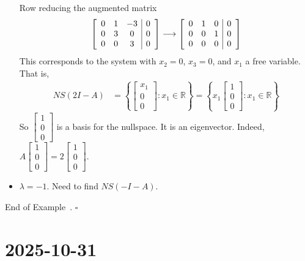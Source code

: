 \documentclass[10pt]{article}
\newenvironment{augmentedmatrix}[1] %
{\left[\begin{array}{#1}}
    {\end{array}\right]}
\theoremstyle{definition}
\newtheorem{example}[theorem]{Example}
\renewenvironment{example}
{\begin{oldexample}}
  {\par\smallskip\hfill   End of Example~\theexample. $\square$    \par\end{oldexample}}
\newcommand{\R}{\mathbb{R}}           %
\begin{document}
\begin{example}
\begin{itemize}
    Row reducing the augmented matrix
    \begin{equation*}
      \begin{augmentedmatrix}{ccc|c}
        0&1&-3&0\\
        0&3&0&0\\
        0&0&3&0
      \end{augmentedmatrix}
      \longrightarrow
      \begin{augmentedmatrix}{ccc|c}
        0&1&0&0\\
        0&0&1&0\\
        0&0&0&0
      \end{augmentedmatrix}
    \end{equation*}
    This corresponds to the system with $x_{2}=0$, $x_{3}=0$, and $x_{1}$ a
    free variable. That is,
    \begin{align*}
      NS(2I-A) 
      &= \left\{
        \begin{bmatrix}
          x_{1}\\0\\0
        \end{bmatrix} : x_{1}\in \R \right\}
      =\left\{
        x_{1}\begin{bmatrix}
          1\\0\\0
        \end{bmatrix} : x_{1}\in \R \right\}
    \end{align*}
    So $
    \begin{bmatrix}
      1\\0\\0
    \end{bmatrix}
    $
    is a basis for the nullspace. It is an eigenvector. Indeed, $A
    \begin{bmatrix}
      1\\0\\0
    \end{bmatrix}=2
    \begin{bmatrix}
      1\\0\\0
    \end{bmatrix}$.
    \item $\lambda=-1$. Need to find $NS(-I-A)$. 
  \end{itemize}
\end{example}

\newpage
\section{2025-10-31}
\end{document}
